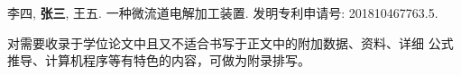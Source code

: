 \documentclass[
  type=master
]{gdutthesis}
\begin{document}

\begin{results}
  \item 李四, \textbf{张三}, 王五. 一种微流道电解加工装置. 发明专利申请号: 201810467763.5.
\end{results}

\gdutstatement

\zhlipsum[1]

\gdutappendix

对需要收录于学位论文中且又不适合书写于正文中的附加数据、资料、详细
公式推导、计算机程序等有特色的内容，可做为附录排写。
\end{document}
